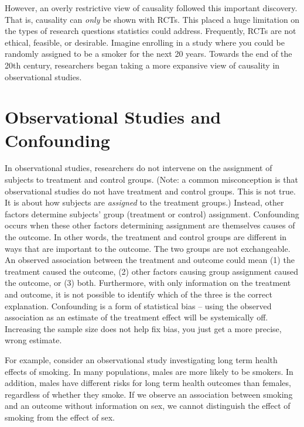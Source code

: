 \documentclass[
]{book}
\begin{document}
However, an overly restrictive view of causality followed this important discovery. That is, causality can \emph{only} be shown with RCTs. This placed a huge limitation on the types of research questions statistics could address. Frequently, RCTs are not ethical, feasible, or desirable. Imagine enrolling in a study where you could be randomly assigned to be a smoker for the next 20 years. Towards the end of the 20th century, researchers began taking a more expansive view of causality in observational studies.

\hypertarget{observational-studies-and-confounding}{%
\section{Observational Studies and Confounding}\label{observational-studies-and-confounding}}

In observational studies, researchers do not intervene on the assignment of subjects to treatment and control groups. (Note: a common misconception is that observational studies do not have treatment and control groups. This is not true. It is about how subjects are \emph{assigned} to the treatment groups.) Instead, other factors determine subjects' group (treatment or control) assignment. Confounding occurs when these other factors determining assignment are themselves causes of the outcome. In other words, the treatment and control groups are different in ways that are important to the outcome. The two groups are not exchangeable. An observed association between the treatment and outcome could mean (1) the treatment caused the outcome, (2) other factors causing group assignment caused the outcome, or (3) both. Furthermore, with only information on the treatment and outcome, it is not possible to identify which of the three is the correct explanation. Confounding is a form of statistical bias -- using the observed association as an estimate of the treatment effect will be systemically off. Increasing the sample size does not help fix bias, you just get a more precise, wrong estimate.

For example, consider an observational study investigating long term health effects of smoking. In many populations, males are more likely to be smokers. In addition, males have different risks for long term health outcomes than females, regardless of whether they smoke. If we observe an association between smoking and an outcome without information on sex, we cannot distinguish the effect of smoking from the effect of sex.
\end{document}
